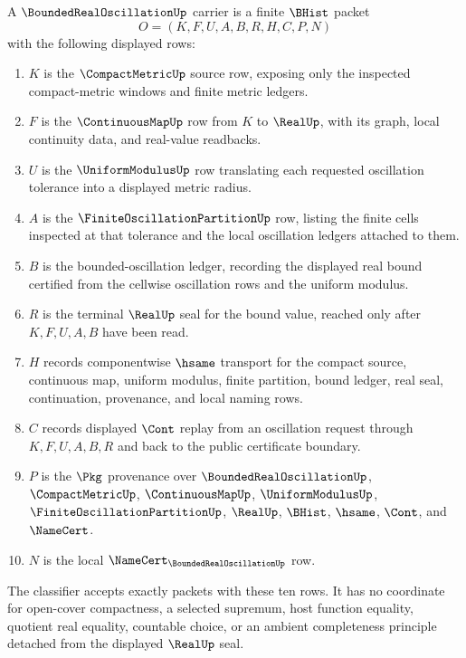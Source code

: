 \begin{definition}
\label{def:bounded-real-oscillation-carrier}
A $\BoundedRealOscillationUp$ carrier is a finite $\BHist$ packet
$$
O=(K,F,U,A,B,R,H,C,P,N)
$$
with the following displayed rows:
\begin{enumerate}
\item $K$ is the $\CompactMetricUp$ source row, exposing only the inspected compact-metric windows and finite metric ledgers.
\item $F$ is the $\ContinuousMapUp$ row from $K$ to $\RealUp$, with its graph, local continuity data, and real-value readbacks.
\item $U$ is the $\UniformModulusUp$ row translating each requested oscillation tolerance into a displayed metric radius.
\item $A$ is the $\FiniteOscillationPartitionUp$ row, listing the finite cells inspected at that tolerance and the local oscillation ledgers attached to them.
\item $B$ is the bounded-oscillation ledger, recording the displayed real bound certified from the cellwise oscillation rows and the uniform modulus.
\item $R$ is the terminal $\RealUp$ seal for the bound value, reached only after $K,F,U,A,B$ have been read.
\item $H$ records componentwise $\hsame$ transport for the compact source, continuous map, uniform modulus, finite partition, bound ledger, real seal, continuation, provenance, and local naming rows.
\item $C$ records displayed $\Cont$ replay from an oscillation request through $K,F,U,A,B,R$ and back to the public certificate boundary.
\item $P$ is the $\Pkg$ provenance over $\BoundedRealOscillationUp$, $\CompactMetricUp$, $\ContinuousMapUp$, $\UniformModulusUp$, $\FiniteOscillationPartitionUp$, $\RealUp$, $\BHist$, $\hsame$, $\Cont$, and $\NameCert$.
\item $N$ is the local $\NameCert_{\BoundedRealOscillationUp}$ row.
\end{enumerate}
The classifier accepts exactly packets with these ten rows. It has no coordinate for open-cover compactness, a selected supremum, host function equality, quotient real equality, countable choice, or an ambient completeness principle detached from the displayed $\RealUp$ seal.
\end{definition}

